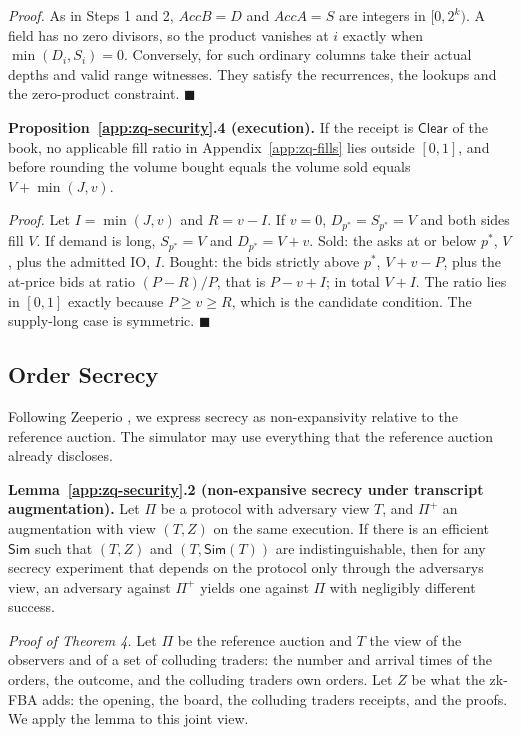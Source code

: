 \emph{Proof.} As in Steps 1 and 2, \(AccB = D\) and \(AccA = S\) are integers in \([0, 2^k)\). A field has no zero divisors, so the product vanishes at \(i\) exactly when \(\min(D_i, S_i) = 0\). Conversely, for such ordinary columns take their actual depths and valid range witnesses. They satisfy the recurrences, the lookups and the zero-product constraint. \(\blacksquare\)

\textbf{Proposition~\ref{app:zq-security}.4 (execution).} If the receipt is \(\mathsf{Clear}\) of the book, no applicable fill ratio in Appendix~\ref{app:zq-fills} lies outside \([0,1]\), and before rounding the volume bought equals the volume sold equals \(V + \min(J, v)\).

\emph{Proof.} Let \(I = \min(J, v)\) and \(R = v - I\). If \(v = 0\), \(D_{p^*} = S_{p^*} = V\) and both sides fill \(V\). If demand is long, \(S_{p^*} = V\) and \(D_{p^*} = V + v\). Sold: the asks at or below \(p^*\), \(V\), plus the admitted IO, \(I\). Bought: the bids strictly above \(p^*\), \(V + v - P\), plus the at-price bids at ratio \((P - R)/P\), that is \(P - v + I\); in total \(V + I\). The ratio lies in \([0, 1]\) exactly because \(P \ge v \ge R\), which is the candidate condition. The supply-long case is symmetric. \(\blacksquare\)

\subsection{Order Secrecy}
\label{app:zq-secrecy-proof}

Following Zeeperio \cite{MEC26}, we express secrecy as non-expansivity relative to the reference auction. The simulator may use everything that the reference auction already discloses.

\textbf{Lemma~\ref{app:zq-security}.2 (non-expansive secrecy under transcript augmentation).} Let \(\Pi\) be a protocol with adversary view \(T\), and \(\Pi^+\) an augmentation with view \((T, Z)\) on the same execution. If there is an efficient \(\mathsf{Sim}\) such that \((T, Z)\) and \((T, \mathsf{Sim}(T))\) are indistinguishable, then for any secrecy experiment that depends on the protocol only through the adversary\textquotesingle s view, an adversary against \(\Pi^+\) yields one against \(\Pi\) with negligibly different success.

\emph{Proof of Theorem 4.} Let \(\Pi\) be the reference auction and \(T\) the view of the observers and of a set of colluding traders: the number and arrival times of the orders, the outcome, and the colluding traders\textquotesingle{} own orders. Let \(Z\) be what the zk-FBA adds: the opening, the board, the colluding traders\textquotesingle{} receipts, and the proofs. We apply the lemma to this joint view.

